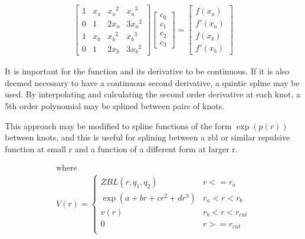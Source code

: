 \begin{equation}
\begin{split}
      \begin{bmatrix}
      1  &  x_a  &  {x_a}^2  &  {x_a}^3     \\
      0  &  1    &  2 x_a    &  3 {x_a}^2   \\
      1  &  x_b  &  {x_b}^2  &  {x_b}^3     \\
      0  &  1    &  2 x_b    &  3 {x_b}^2
      \end{bmatrix}
      \begin{bmatrix}
      c_0 \\
      c_1 \\ 
      c_2 \\ 
      c_3
      \end{bmatrix}
      = 
      \begin{bmatrix}
      f(x_a) \\
      f'(x_a) \\ 
      f(x_b) \\ 
      f'(x_b)
      \end{bmatrix}
\end{split}
\label{eq:eqSplineThreeMatrix}
\end{equation}

It is important for the function and its derivative to be continuous.  If it is also deemed necessary to have a continuous second derivative, a quintic spline may be used.  By interpolating and calculating the second order derivative at each knot, a 5th order polynomial may be splined between pairs of knots.  

This approach may be modified to spline functions of the form $\exp(p(r))$ between knots, and this is useful for splining between a \acrshort{zbl} or similar repulsive function at small r and a function of a different form at larger r.

\begin{equation}
\begin{split}
\text{where } \\
V(r) = \left\{ \begin{matrix} 
ZBL(r, q_1, q_2) & r<= r_a \\  
\exp(a+br+cr^2 + dr^3) & r_a < r < r_b \\ 
v(r) & r_b < r < r_{cut} \\ 
0 & r >= r_{cut} \\
\end{matrix} \right . 
\end{split}
\label{eq:zblCubicSpline}
\end{equation}


